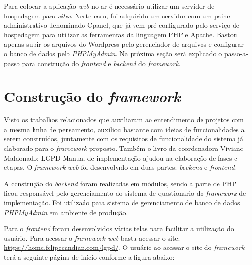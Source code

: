 \documentclass[
	12pt,				%
	openright,			%
	oneside,			%
	a4paper,			%
	english,			%
	french,				%
	spanish,			%
	brazil,				%
	]{abntex2}
\begin{document}
Para colocar a aplicação \textit{web} no ar é necessário utilizar um servidor de hospedagem para \textit{sites}. Neste caso, foi adquirido um servidor com um painel administrativo denominado Cpanel, que já vem pré-configurado pelo serviço de hospedagem para utilizar as ferramentas da linguagem PHP e Apache. Bastou apenas subir os arquivos do Wordpress pelo gerenciador de arquivos  e configurar o banco de dados pelo \textit{PHPMyAdmin}. Na próxima seção será explicado o passo-a-passo para construção do \textit{frontend} e \textit{backend} do \textit{framework}. 
\section{Construção do \textit{framework} }


Visto os trabalhos relacionados que auxiliaram ao entendimento de projetos com a mesma linha de pensamento, auxiliou bastante com ideias de funcionalidades a serem construídos, juntamente com os requisitos de funcionalidade do sistema já elaborado para o \textit{framework} proposto. Também o livro da coordenadora Viviane Maldonado: LGPD Manual de implementação ajudou na elaboração de fases e etapas.
O \textit{framework web} foi desenvolvido em duas partes: \textit{backend} e \textit{frontend}.  

A construção do \textit{backend} foram realizadas em módulos, sendo a parte de PHP ficou responsável pelo gerenciamento do sistema de questionário do \textit{framework} de implementação. Foi utilizado para sistema de gerenciamento de banco de dados \textit{PHPMyAdmin} em ambiente de produção.

Para o \textit{frontend} foram desenvolvidos várias telas para facilitar a utilização do usuário. Para acessar o \textit{framework web} basta acessar o site:  \url{https://home.felipecandian.com/lgpd/}.
O usuário ao acessar o site do \textit{framework} terá a seguinte página de início conforme a figura abaixo:
\end{document}
